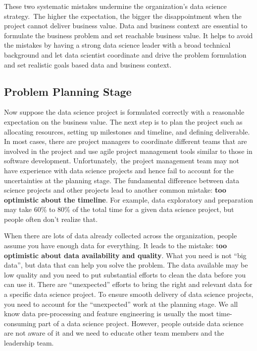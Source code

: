 \documentclass[12pt,]{krantz}
\begin{document}
These two systematic mistakes undermine the organization's data science strategy.~The higher the expectation, the bigger the disappointment when the project cannot deliver business value. Data and business context are essential to formulate the business problem and set reachable business value. It helps to avoid the mistakes by having a strong data science leader with a broad technical background and let data scientist coordinate and drive the problem formulation and set realistic goals based data and business context.

\hypertarget{problem-planning-stage}{%
\subsection{Problem Planning Stage}\label{problem-planning-stage}}

Now suppose the data science project is formulated correctly with a reasonable expectation on the business value. The next step is to plan the project such as allocating resources, setting up milestones and timeline, and defining deliverable. In most cases, there are project managers to coordinate different teams that are involved in the project and use agile project management tools similar to those in software development. Unfortunately,~the project management team may not have experience with data science projects and hence fail to account for the uncertainties at the planning stage. The fundamental difference between data science projects and other projects lead to another common mistake: \textbf{too optimistic about the timeline}. For example, data exploratory and preparation may take 60\% to 80\% of the total time for a given data science project, but people often don't realize that.

When there are lots of data already collected across the organization, people assume you have enough data for everything. It leads to the mistake: t\textbf{oo optimistic about data availability and quality}. What you need is not ``big data'', but data that can help you solve the problem. The data available may be low quality and you need to put substantial efforts to clean the data before you can use it. There are ``unexpected'' efforts to bring the right and relevant data for a specific data science project. To ensure smooth delivery of data science projects, you need to account for the ``unexpected'' work at the planning stage. We all know data pre-processing and feature engineering is usually the most time-consuming part of a data science project. However, people outside data science are not aware of it and we need to educate other team members and the leadership team.
\end{document}
